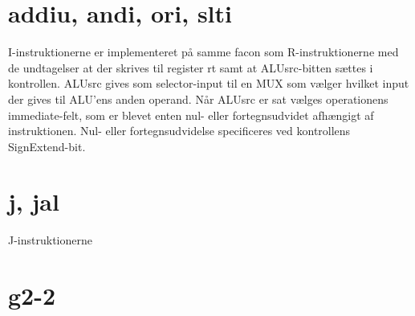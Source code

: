 \documentclass[10pt,a4paper,danish]{article}
\begin{document}
\section{addiu, andi, ori, slti} 
I-instruktionerne er implementeret på samme facon som R-instruktionerne med de undtagelser at der skrives til register rt samt at ALUsrc-bitten sættes i kontrollen. ALUsrc gives som selector-input til en MUX som vælger hvilket input der gives til ALU'ens anden operand. Når ALUsrc er sat vælges operationens immediate-felt, som er blevet enten nul- eller fortegnsudvidet afhængigt af instruktionen. Nul- eller fortegnsudvidelse specificeres ved kontrollens SignExtend-bit. 

\section{j, jal}
J-instruktionerne 



\section{g2-2}
\end{document}
